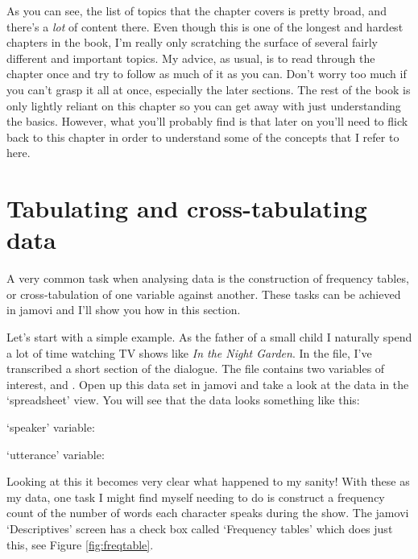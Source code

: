 As you can see, the list of topics that the chapter covers is pretty broad, and there's a {\it lot} of content there. Even though this is one of the longest and hardest chapters in the book, I'm really only scratching the surface of several fairly different and important topics. My advice, as usual, is to read through the chapter once and try to follow as much of it as you can. Don't worry too much if you can't grasp it all at once, especially the later sections. The rest of the book is only lightly reliant on this chapter so you can get away with just understanding the basics. However, what you'll probably find is that later on you'll need to flick back to this chapter in order to understand some of the concepts that I refer to here.


\section{Tabulating and cross-tabulating data\label{sec:freqtables}}

A very common task when analysing data is the construction of frequency tables, or cross-tabulation of one variable against another. These tasks can be achieved in jamovi and I'll show you how in this section. 


Let's start with a simple example. As the father of a small child I naturally spend a lot of time watching TV shows like {\it In the Night Garden}. In the  file, I've transcribed a short section of the dialogue. The file contains two variables of interest,  and . Open up this data set in jamovi and take a look at the data in the `spreadsheet' view. You will see that the data looks something like this:

\noindent
`speaker' variable: \\

\noindent
`utterance' variable: \\

\noindent
Looking at this it becomes very clear what happened to my sanity! With these as my data, one task I might find myself needing to do is construct a frequency count of the number of words each character speaks during the show. The jamovi `Descriptives' screen has a check box called `Frequency tables' which does just this, see Figure \ref{fig:freqtable}. 

